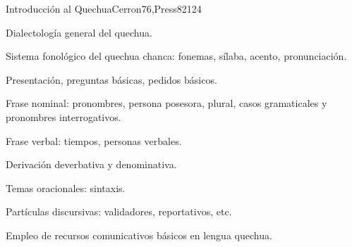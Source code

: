 \begin{syllabus}
\begin{competences}
    \item {}
    \item {}
    \item {}
    \item {}
\end{competences}

\begin{unit}{Introducción al Quechua}{}{Cerron76,Press82}{12}{4}
   \begin{topics}
      \item Dialectología general del quechua.
      \item Sistema fonológico del quechua chanca: fonemas, sílaba, acento, pronunciación.
      \item Presentación, preguntas básicas, pedidos básicos.
      \item Frase nominal: pronombres, persona posesora, plural, casos gramaticales y pronombres interrogativos.
      \item Frase verbal: tiempos, personas verbales.
      \item Derivación deverbativa y denominativa.
      \item Temas oracionales: sintaxis.
      \item Partículas discursivas: validadores, reportativos, etc.
                
   \end{topics}

   \begin{learningoutcomes}
      \item Empleo de recursos comunicativos básicos en lengua quechua.
   \end{learningoutcomes}
\end{unit}

\begin{coursebibliography}
\end{coursebibliography}

\end{syllabus}
